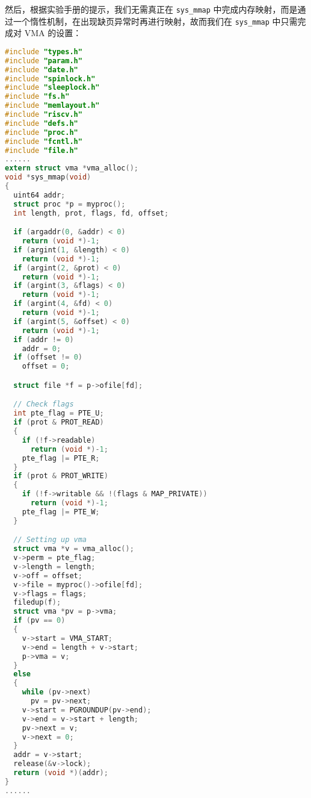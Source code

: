 然后，根据实验手册的提示，我们无需真正在 \lstinline{sys_mmap} 中完成内存映射，而是通过一个惰性机制，在出现缺页异常时再进行映射，故而我们在 \lstinline{sys_mmap} 中只需完成对 VMA 的设置：
\begin{lstlisting}[language=C]
#include "types.h"
#include "param.h"
#include "date.h"
#include "spinlock.h"
#include "sleeplock.h"
#include "fs.h"
#include "memlayout.h"
#include "riscv.h"
#include "defs.h"
#include "proc.h"
#include "fcntl.h"
#include "file.h"
......
extern struct vma *vma_alloc();
void *sys_mmap(void)
{
  uint64 addr;
  struct proc *p = myproc();
  int length, prot, flags, fd, offset;

  if (argaddr(0, &addr) < 0)
    return (void *)-1;
  if (argint(1, &length) < 0)
    return (void *)-1;
  if (argint(2, &prot) < 0)
    return (void *)-1;
  if (argint(3, &flags) < 0)
    return (void *)-1;
  if (argint(4, &fd) < 0)
    return (void *)-1;
  if (argint(5, &offset) < 0)
    return (void *)-1;
  if (addr != 0)
    addr = 0;
  if (offset != 0)
    offset = 0;

  struct file *f = p->ofile[fd];

  // Check flags
  int pte_flag = PTE_U;
  if (prot & PROT_READ)
  {
    if (!f->readable)
      return (void *)-1;
    pte_flag |= PTE_R;
  }
  if (prot & PROT_WRITE)
  {
    if (!f->writable && !(flags & MAP_PRIVATE))
      return (void *)-1;
    pte_flag |= PTE_W;
  }

  // Setting up vma
  struct vma *v = vma_alloc();
  v->perm = pte_flag;
  v->length = length;
  v->off = offset;
  v->file = myproc()->ofile[fd];
  v->flags = flags;
  filedup(f);
  struct vma *pv = p->vma;
  if (pv == 0)
  {
    v->start = VMA_START;
    v->end = length + v->start;
    p->vma = v;
  }
  else
  {
    while (pv->next)
      pv = pv->next;
    v->start = PGROUNDUP(pv->end);
    v->end = v->start + length;
    pv->next = v;
    v->next = 0;
  }
  addr = v->start;
  release(&v->lock);
  return (void *)(addr);
}
......
\end{lstlisting}


